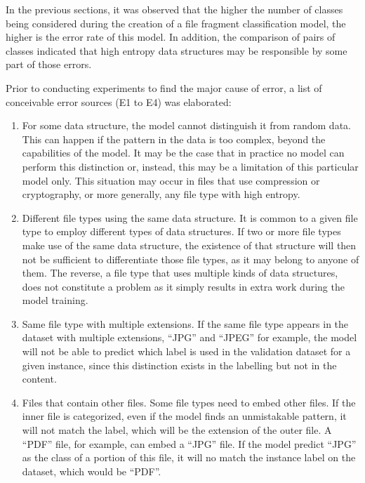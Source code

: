 \label{sec:exprandom}

In the previous sections, it was observed that the higher the number of classes being considered during the creation of a file fragment classification model, the higher is the error rate of this model. In addition, the comparison of pairs of classes indicated that high entropy data structures may be responsible by some part of those errors.

Prior to conducting experiments to find the major cause of error, a list of conceivable error sources (E1 to E4) was elaborated:
\begin{enumerate}[itemindent=\parindent,label=\textbf{E\arabic*.}]
    \item For some data structure, the model cannot distinguish it from random data. This can happen if the pattern in the data is too complex, beyond the capabilities of the model. It may be the case that in practice no model can perform this distinction or, instead, this may be a limitation of this particular model only. This situation may occur in files that use compression or cryptography, or more generally, any file type with high entropy.

    \item Different file types using the same data structure. It is common to a given file type to employ different types of data structures. If two or more file types make use of the same data structure, the existence of that structure will then not be sufficient to differentiate those file types, as it may belong to anyone of them.
    The reverse, a file type that uses multiple kinds of data structures, does not constitute a problem as it simply results in extra work during the model training.

    \item Same file type with multiple extensions. If the same file type appears in the dataset with multiple extensions, ``JPG'' and ``JPEG'' for example, the model will not be able to predict which label is used in the validation dataset for a given instance, since this distinction exists in the labelling but not in the content.

    \item Files that contain other files. Some file types need to embed other files. If the inner file is categorized, even if the model finds an unmistakable pattern, it will not match the label, which will be the extension of the outer file. A ``PDF'' file, for example, can embed a ``JPG'' file. If the model predict ``JPG'' as the class of a portion of this file, it will no match the instance label on the dataset, which would be ``PDF''.
\end{enumerate}

